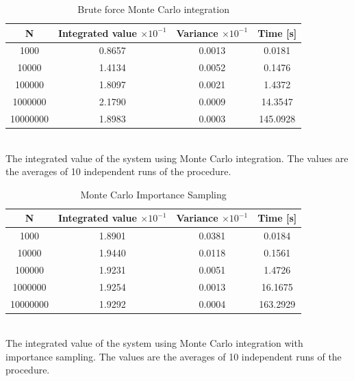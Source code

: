 \documentclass[%
reprint,
amsmath,amssymb,
aps,
]{revtex4-1}
\begin{document}
\begin{table}[!h]
	\caption{Brute force Monte Carlo integration}
	\begin{tabular}{|c|c|c|c|}
		\hline 
		\hspace{5mm} \textbf{N} \hspace{5mm} & \textbf{Integrated value} $\times 10^{-1}$& \hspace{3mm} \textbf{Variance} $\times 10^{-1}$ & \hspace{3mm} \textbf{Time  [s]} \hspace{5mm}\\
		\hline 
			1000 & 0.8657  & 0.0013  & 0.0181 \\
			10000 & 1.4134  & 0.0052  & 0.1476 \\
			100000 & 1.8097  & 0.0021  & 1.4372 \\
			1000000 & 2.1790  & 0.0009  & 14.3547 \\
			10000000 & 1.8983  & 0.0003  & 145.0928 \\
		\hline 
	\end{tabular} \\ [3pt]
	\label{mc_values} \centering The integrated value of the system using Monte Carlo integration. The values are the averages of 10 independent runs of the procedure. 
\end{table}


\begin{table}[!h]
	\caption{Monte Carlo Importance Sampling}
	\begin{tabular}{|c|c|c|c|}
		\hline 
		\hspace{5mm} \textbf{N} \hspace{5mm} & \textbf{Integrated value} $\times 10^{-1}$& \hspace{3mm} \textbf{Variance}  $\times 10^{-1}$& \hspace{3mm} \textbf{Time  [s]} \hspace{5mm}\\
		\hline 
			1000 & 1.8901  & 0.0381  & 0.0184 \\
			10000 & 1.9440  & 0.0118  & 0.1561 \\
			100000 & 1.9231  & 0.0051  & 1.4726 \\
			1000000 & 1.9254  & 0.0013  & 16.1675 \\
			10000000 & 1.9292  & 0.0004  & 163.2929 \\

		\hline 
	\end{tabular} \\ 
	[3pt]\label{mc_values_is} \centering The integrated value of the system using Monte Carlo integration with importance sampling. The values are the averages of 10 independent runs of the procedure.
\end{table}
\end{document}
